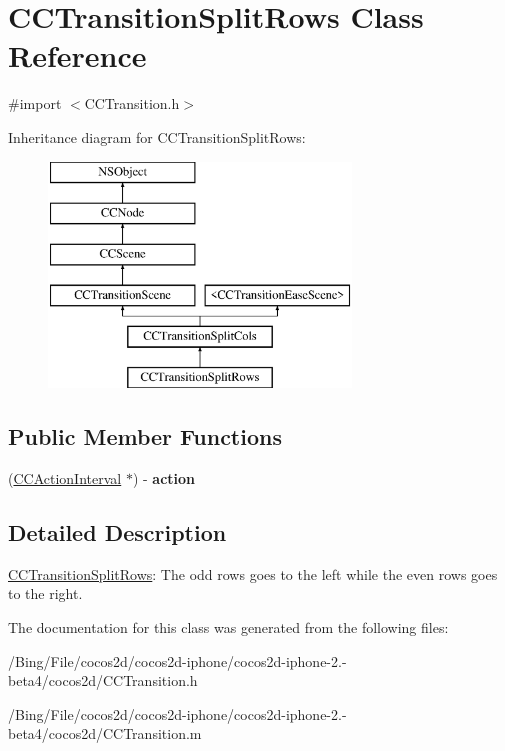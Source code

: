 \hypertarget{interface_c_c_transition_split_rows}{\section{C\-C\-Transition\-Split\-Rows Class Reference}
\label{interface_c_c_transition_split_rows}
}


{\ttfamily \#import $<$C\-C\-Transition.\-h$>$}

Inheritance diagram for C\-C\-Transition\-Split\-Rows\-:\begin{figure}[H]
\begin{center}
\leavevmode
\includegraphics[height=6.000000cm]{interface_c_c_transition_split_rows}
\end{center}
\end{figure}
\subsection*{Public Member Functions}
\begin{DoxyCompactItemize}
\item 
\hypertarget{interface_c_c_transition_split_rows_aafec4ffdf2b837ac2306cae5dae7ae24}{(\hyperlink{class_c_c_action_interval}{C\-C\-Action\-Interval} $\ast$) -\/ {\bfseries action}}\label{interface_c_c_transition_split_rows_aafec4ffdf2b837ac2306cae5dae7ae24}

\end{DoxyCompactItemize}


\subsection{Detailed Description}
\hyperlink{interface_c_c_transition_split_rows}{C\-C\-Transition\-Split\-Rows}\-: The odd rows goes to the left while the even rows goes to the right. 

The documentation for this class was generated from the following files\-:\begin{DoxyCompactItemize}
\item 
/\-Bing/\-File/cocos2d/cocos2d-\/iphone/cocos2d-\/iphone-\/2.-\/beta4/cocos2d/C\-C\-Transition.\-h\item 
/\-Bing/\-File/cocos2d/cocos2d-\/iphone/cocos2d-\/iphone-\/2.-\/beta4/cocos2d/C\-C\-Transition.\-m\end{DoxyCompactItemize}
